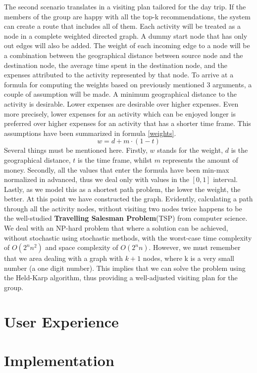 \documentclass[11pt,a4paper,oneside]{article}
\begin{document}
The second scenario translates in a visiting plan tailored for the day trip. If the members of the group are happy with all the top-k recommendations, the system can create a route that includes all of them. Each activity will be treated as a node in a complete weighted directed graph. A dummy start node that has only out edges will also be added. The weight of each incoming edge to a node will be a combination between the geographical distance between source node and the destination node, the average time spent in the destination node, and the expenses attributed to the activity represented by that node. To arrive at a formula for computing the weights based on previously mentioned 3 arguments, a couple of assumption will be made. A minimum geographical distance to the activity is desirable. Lower expenses are desirable over higher expenses. Even more precisely, lower expenses for an activity which can be enjoyed longer is preferred over higher expenses for an activity that has a shorter time frame. This assumptions have been summarized in formula \ref{weights}.
\begin{equation}
    \label{weights}
    w = d + m \cdot (1 - t)
\end{equation}
Several things must be mentioned here. Firstly, $w$ stands for the weight, $d$ is the geographical distance, $t$ is the time frame, whilst $m$ represents the amount of money. Secondly, all the values that enter the formula have been min-max normalized in advanced, thus we deal only with values in the $[0, 1]$ interval. Lastly, as we model this as a shortest path problem, the lower the weight, the better. At this point we have constructed the graph. Evidently, calculating a path through all the activity nodes, without visiting two nodes twice happens to be the well-studied \textbf{Travelling Salesman Problem}(TSP) from computer science. We deal with an NP-hard problem that where a solution can be achieved, without stochastic using stochastic methods, with the worst-case time complexity of $O(2^nn^2)$ and space complexity of $O(2^nn)$. However, we must remember that we area dealing with a graph with $k+1$ nodes, where k is a very small number (a one digit number). This implies that we can solve the problem using the Held-Karp algorithm, thus providing a well-adjusted visiting plan for the group.

\section{User Experience}
\section{Implementation}
\end{document}

